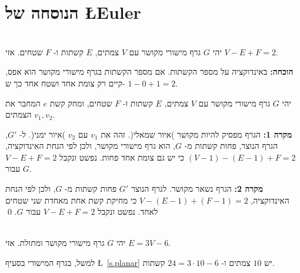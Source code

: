 \section{הנוסחה של
\L{Euler}}

\begin{theorem}[\L{Euler}]\label{thm.euler}\mbox{}\\
יהי
$G$
גרף מישורי מקושר עם
$V$
צמתים,
$E$
קשתות ו-%
$F$
שטחים. אזי
$V-E+F=2$.
\end{theorem}

\textbf{הוכחה:}
באינדוקציה על מספר הקשתות. אם מספר הקשתות בגרף מישורי מקושר הוא אפס, קיים רק צומת אחד ושטח אחד כך ש-%
$1-0+1=2$.

יהי 
$G$
גרף מישורי מקושר עם 
$V$
צמתים, 
$E$
קשתות ו-%
$F$
שטחים, ומחק קשת 
$e$
המחבר את הצמתים
$v_1,v_2$.


\textbf{מקרה 1:}
הגרף מפסיק להיות מקושר )איור שמאלי(. זהה את
$v_1$
עם
$v_2$
)איור ימני(.
ל-%
$G'$,
הגרף הנוצר, פחות קשתות מ-%
$G$,
הוא גרף מישורי מקושר,
ולכן לפי הנחת האינדוקציה,
$(V-1)-(E-1)+F=2$
כי יש גם צומת אחד פחות. נפשט ונקבל
$V-E+F=2$
עבור
$G$.

\begin{center}
\end{center}

\textbf{מקרה 2:}
הגרף נשאר מקושר. לגרף הנוצר
$G'$
פחות קשתות מ-%
$G$,
ולכן לפי הנחת האינדוקציה,
$V-(E-1)+(F-1)=2$
כי מחיקת קשת אחת מאחדת שני שטחים לאחד. נפשט ונקבל
$V-E+F=2$ 
עבור
$G$.
\qed

\begin{center}
\end{center}
\begin{theorem}\mbox{}\\
יהי
$G$
גרף מישורי מקושר ומתולת. אזי
$E= 3V-6$.
\end{theorem}
למשל, בגרף המישורי בסעיף
\L{~\ref{s.planar}}
יש
$10$
צמתים ו-%
$24= 3\cdot 10-6$
קשתות.

